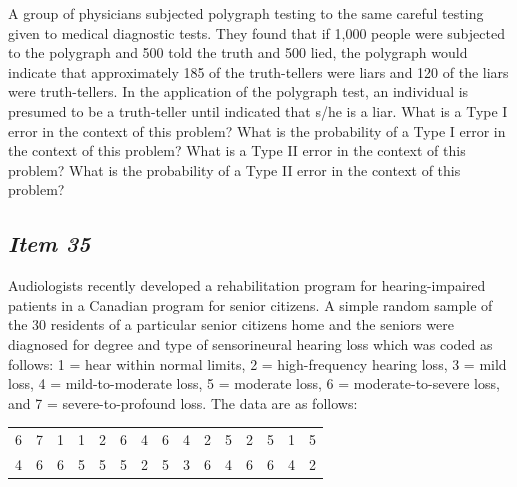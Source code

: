 A group of physicians subjected polygraph testing to the same careful testing given to medical diagnostic tests. They found that if 1,000 people were subjected to the polygraph and 500 told the truth and 500 lied, the polygraph would indicate that approximately 185 of the truth-tellers were liars and 120 of the liars were truth-tellers. In the application of the polygraph test, an individual is presumed to be a truth-teller until indicated that s/he is a liar. What is a Type I error in the context of this problem? What is the probability of a Type I error in the context of this problem? What is a Type II error in the context of this problem? What is the probability of a Type II error in the context of this problem?








\subsection{\textbf{\textit{Item 35}}}


Audiologists recently developed a rehabilitation program for hearing-impaired patients in a Canadian program for senior citizens. A simple random sample of the 30 residents of a particular senior citizens home and the seniors were diagnosed for degree and type of sensorineural hearing loss which was coded as follows: 1 = hear within normal limits, 2 = high-frequency hearing loss, 3 = mild loss, 4 = mild-to-moderate loss, 5 = moderate loss, 6 = moderate-to-severe loss, and 7 = severe-to-profound loss. The data are as follows: 





\begin{table}[!ht]


\begin{center}


\begin{tabular}{lllllllllllllll}


6 & 7 & 1 & 1 & 2 & 6 & 4 & 6 & 4 & 2 & 5 & 2 & 5 & 1& 5\\


4 & 6 & 6 & 5 & 5 & 5 & 2 & 5 & 3 & 6 & 4 & 6 & 6 & 4 & 2\\


\end{tabular}


\end{center}


\end{table}





